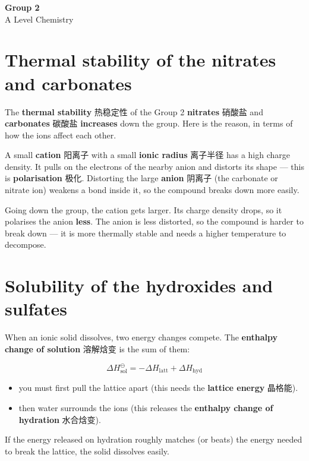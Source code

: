\documentclass[11pt]{article}
\begin{document}
\begin{center}
  {\LARGE\bfseries Group 2}\\[0.35em]
  {\large A Level Chemistry}
\end{center}
\vspace{0.6em}

\section*{Thermal stability of the nitrates and carbonates}

The \textbf{thermal stability} 热稳定性 of the Group 2 \textbf{nitrates} 硝酸盐 and \textbf{carbonates} 碳酸盐 \textbf{increases} down the group. Here is the reason, in terms of how the ions affect each other.

A small \textbf{cation} 阳离子 with a small \textbf{ionic radius} 离子半径 has a high charge density. It pulls on the electrons of the nearby anion and distorts its shape — this is \textbf{polarisation} 极化. Distorting the large \textbf{anion} 阴离子 (the carbonate or nitrate ion) weakens a bond inside it, so the compound breaks down more easily.

Going down the group, the cation gets larger. Its charge density drops, so it polarises the anion \textbf{less}. The anion is less distorted, so the compound is harder to break down — it is more thermally stable and needs a higher temperature to decompose.

\section*{Solubility of the hydroxides and sulfates}

When an ionic solid dissolves, two energy changes compete. The \textbf{enthalpy change of solution} 溶解焓变 is the sum of them:

\[
\Delta H^{\ominus}_{\text{sol}} = -\Delta H_{\text{latt}} + \Delta H_{\text{hyd}}
\]

\begin{itemize}
\item you must first pull the lattice apart (this needs the \textbf{lattice energy} 晶格能).

\item then water surrounds the ions (this releases the \textbf{enthalpy change of hydration} 水合焓变).

\end{itemize}

If the energy released on hydration roughly matches (or beats) the energy needed to break the lattice, the solid dissolves easily.
\end{document}
